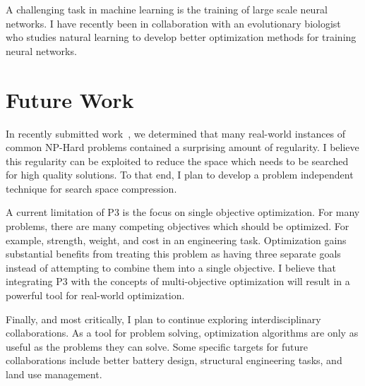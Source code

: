 \documentclass[a4paper, 11pt]{article}
\begin{document}
A challenging task in machine learning is the training of large scale neural networks.
I have recently been in collaboration with an evolutionary biologist
who studies natural learning to develop better optimization methods for training neural networks.

\section{Future Work}
In recently submitted work~\cite{whitley:2016:mkl}, we determined that many real-world
instances of common NP-Hard problems contained a surprising amount of regularity.
I believe this regularity can be exploited to reduce the space
which needs to be searched for high quality solutions. To that end, I plan to develop
a problem independent technique for search space compression.

A current limitation of P3 is the focus on single objective optimization. For many
problems, there are many competing objectives which should be optimized. For example,
strength, weight, and cost in an engineering task. Optimization gains substantial
benefits from treating this problem as having three separate goals instead of attempting
to combine them into a single objective. I believe that integrating P3 with the concepts
of multi-objective optimization will result in a powerful tool for real-world optimization.

Finally, and most critically, I plan to continue exploring interdisciplinary collaborations.
As a tool for problem solving, optimization algorithms are only as useful as the problems they
can solve. Some specific targets for future collaborations include better battery design,
structural engineering tasks, and land use management.




\small



\end{document}
